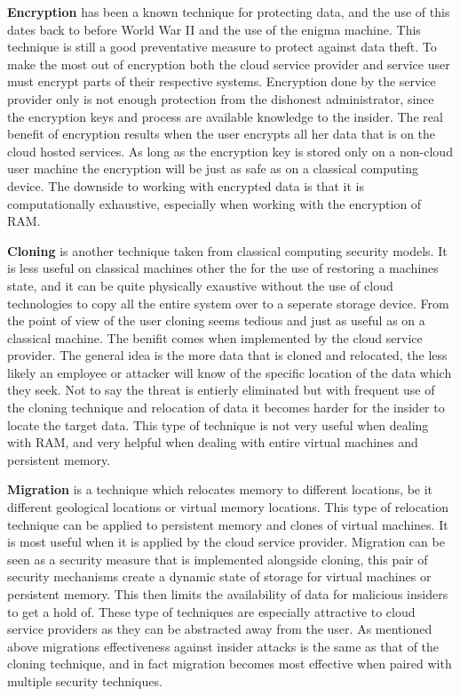 \textbf{Encryption} has been a known technique for protecting data, and the use of this dates back to before World War II and the use of the enigma machine. This technique is still a good preventative measure to protect against data theft. To make the most out of encryption both the cloud service provider and service user must encrypt parts of their respective systems. \cite{kandias} Encryption done by the service provider only is not enough protection from the dishonest administrator, since the encryption keys and process are available knowledge to the insider. The real benefit of encryption results when the user encrypts all her data that is on the cloud hosted services. \cite{kandias} As long as the encryption key is stored only on a non-cloud user machine the encryption will be just as safe as on a classical computing device. The downside to working with encrypted data is that it is computationally exhaustive, especially when working with the encryption of RAM. \cite{szefer}

\label{llCloning}

\textbf{Cloning} is another technique taken from classical computing security models. It is less useful on classical machines other the for the use of restoring a machines state, and it can be quite physically exaustive without the use of cloud technologies to copy all the entire system over to a seperate storage device. From the point of view of the user cloning seems tedious and just as useful as on a classical machine. The benifit comes when implemented by the cloud service provider. \cite{kandias} The general idea is the more data that is cloned and relocated, the less likely an employee or attacker will know of the specific location of the data which they seek. Not to say the threat is entierly eliminated but with frequent use of the cloning technique and relocation of data it becomes harder for the insider to locate the target data. \cite{szefer} This type of technique is not very useful when dealing with RAM, and very helpful when dealing with entire virtual machines and persistent memory.

\label{llMigration}

\textbf{Migration} is a technique which relocates memory to different locations, be it different geological locations or virtual memory locations. This type of relocation technique can be applied to persistent memory and clones of virtual machines. It is most useful when it is applied by the cloud service provider. \cite{kandias} Migration can be seen as a security measure that is implemented alongside cloning, this pair of security mechanisms create a dynamic state of storage for virtual machines or persistent memory. This then limits the availability of data for malicious insiders to get a hold of. These type of techniques are especially attractive to cloud service providers as they can be abstracted away from the user. \cite{szefer} As mentioned above migrations effectiveness against insider attacks is the same as that of the cloning technique, and in fact migration becomes most effective when paired with multiple security techniques.

